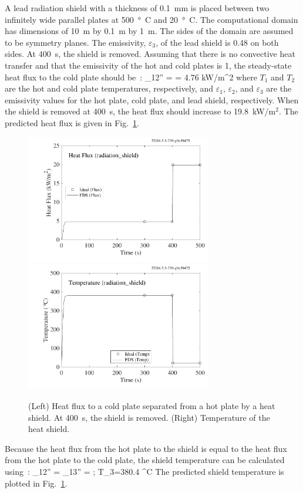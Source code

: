\documentclass[11pt]{book}
\begin{document}
A lead radiation shield with a thickness of 0.1~mm is placed between two infinitely wide parallel plates at 500~\si{\degree C} and 20~\si{\degree C}.  The computational domain has dimensions of 10~m by 0.1~m by 1~m. The sides of the domain are assumed to be symmetry planes.  The emissivity, $\varepsilon_{3}$, of the lead shield is 0.48 on both sides.  At 400~s, the shield is removed.  Assuming that there is no convective heat transfer and that the emissivity of the hot and cold plates is 1, the steady-state heat flux to the cold plate should be~\cite{Incropera:1}:
\be
   \dq_{12}'' =  = 4.76 \; \hbox{kW/m}^2
\ee
where $T_{1}$ and $T_{2}$ are the hot and cold plate temperatures, respectively, and $\varepsilon_1$, $\varepsilon_2$, and $\varepsilon_3$ are the emissivity values for the hot plate, cold plate, and lead shield, respectively. When the shield is removed at 400~s, the heat flux should increase to 19.8~kW/m$^2$.  The predicted heat flux is given in Fig.~\ref{radiation_shield_plot}.
\begin{figure}[ht]
\includegraphics[width=3.2in]{SCRIPT_FIGURES/radiation_shield_flux}
\includegraphics[width=3.2in]{SCRIPT_FIGURES/radiation_shield_temp}
\caption[The  test case]{(Left) Heat flux to a cold plate separated from a hot plate by a heat shield. At 400~s, the shield is removed. (Right) Temperature of the heat shield.}
\label{radiation_shield_plot}
\end{figure}
Because the heat flux from the hot plate to the shield is equal to the heat flux from the hot plate to the cold plate, the shield temperature can be calculated using~\cite{Incropera:1}:
\be
   \dq_{12}'' = \dq_{13}'' =  \quad ; \quad T_3=380.4 \; ^\circ\hbox{C}
\ee
The predicted shield temperature is plotted in Fig.~\ref{radiation_shield_plot}.
\end{document}
